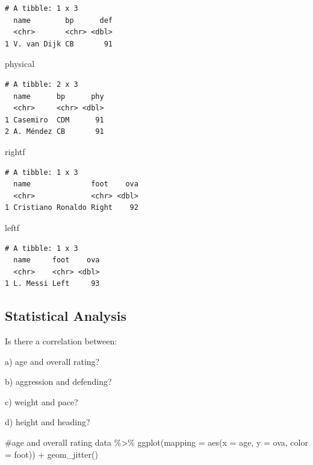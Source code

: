 \documentclass[
  letterpaper,
  DIV=11,
  numbers=noendperiod]{scrartcl}
\newenvironment{Shaded}{\begin{snugshade}}{\end{snugshade}}
\newcommand{\AttributeTok}[1]{\textcolor[rgb]{0.40,0.45,0.13}{#1}}
\newcommand{\CommentTok}[1]{\textcolor[rgb]{0.37,0.37,0.37}{#1}}
\newcommand{\FunctionTok}[1]{\textcolor[rgb]{0.28,0.35,0.67}{#1}}
\newcommand{\NormalTok}[1]{\textcolor[rgb]{0.00,0.23,0.31}{#1}}
\newcommand{\SpecialCharTok}[1]{\textcolor[rgb]{0.37,0.37,0.37}{#1}}
\begin{document}
\begin{verbatim}
# A tibble: 1 x 3
  name        bp      def
  <chr>       <chr> <dbl>
1 V. van Dijk CB       91
\end{verbatim}

\begin{Shaded}
\begin{Highlighting}[]
\NormalTok{physical}
\end{Highlighting}
\end{Shaded}

\begin{verbatim}
# A tibble: 2 x 3
  name      bp      phy
  <chr>     <chr> <dbl>
1 Casemiro  CDM      91
2 A. Méndez CB       91
\end{verbatim}

\begin{Shaded}
\begin{Highlighting}[]
\NormalTok{rightf}
\end{Highlighting}
\end{Shaded}

\begin{verbatim}
# A tibble: 1 x 3
  name              foot    ova
  <chr>             <chr> <dbl>
1 Cristiano Ronaldo Right    92
\end{verbatim}

\begin{Shaded}
\begin{Highlighting}[]
\NormalTok{leftf}
\end{Highlighting}
\end{Shaded}

\begin{verbatim}
# A tibble: 1 x 3
  name     foot    ova
  <chr>    <chr> <dbl>
1 L. Messi Left     93
\end{verbatim}

\hypertarget{statistical-analysis}{%
\subsection{Statistical Analysis}\label{statistical-analysis}}

Is there a correlation between:

a) age and overall rating?

b) aggression and defending?

c) weight and pace?

d) height and heading?

\begin{Shaded}
\begin{Highlighting}[]
\CommentTok{\#age and overall rating}
\NormalTok{data }\SpecialCharTok{\%\textgreater{}\%} 
  \FunctionTok{ggplot}\NormalTok{(}\AttributeTok{mapping =} \FunctionTok{aes}\NormalTok{(}\AttributeTok{x =}\NormalTok{ age, }\AttributeTok{y =}\NormalTok{ ova, }\AttributeTok{color =}\NormalTok{ foot)) }\SpecialCharTok{+} 
  \FunctionTok{geom\_jitter}\NormalTok{() }
\end{Highlighting}
\end{Shaded}
\end{document}
